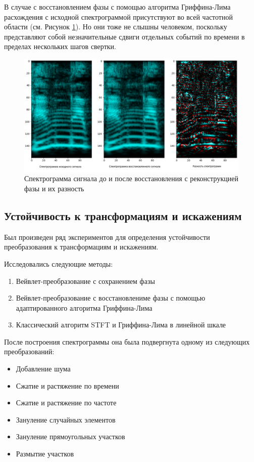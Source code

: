 В случае с восстановлением фазы с помощью алгоритма Гриффина-Лима расхождения с исходной спектрограммой присутствуют во всей частотной области
(см. Рисунок \ref{fig:spec_diff_griffinlim}). Но они тоже не слышны человеком, поскольку представляют собой незначительные сдвиги 
отдельных событий по времени в пределах нескольких шагов свертки.

\begin{figure}
  \centering
  \includegraphics[width=0.8\linewidth]{figures/spec_diff_griffinlim}
  \caption{Спектрограмма сигнала до и после восстановления с реконструкцией фазы и их разность}
  \label{fig:spec_diff_griffinlim}
\end{figure}


\subsection{Устойчивость к трансформациям и искажениям}

Был произведен ряд экспериментов для определения устойчивости преобразования к трансформациям и искажениям. 

Исследовались следующие методы:
\begin{enumerate}[1.]
  \item Вейвлет-преобразование с сохранением фазы
  \item Вейвлет-преобразование с восстановлениме фазы с помощью адаптированного алгоритма Гриффина-Лима
  \item Классический алгоритм STFT и Гриффина-Лима в линейной шкале
\end{enumerate}

После построения спектрограммы она была подвергнута одному из следующих преобразований:
\begin{itemize}
  \item Добавление шума
  \item Сжатие и растяжение по времени
  \item Сжатие и растяжение по частоте
  \item Зануление случайных элементов
  \item Зануление прямоугольных участков
  \item Размытие участков
\end{itemize}

